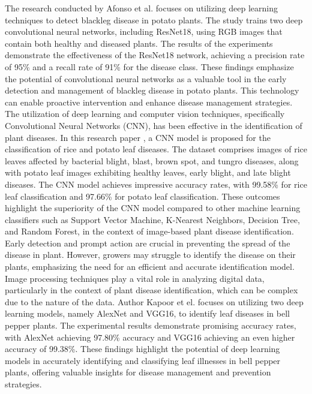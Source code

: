 \documentclass[conference]{IEEEtran}
\begin{document}
The research conducted by Afonso et al. \cite{AFONSO20196} focuses on utilizing deep learning techniques to detect blackleg disease in potato plants. The study trains two deep convolutional neural networks, including ResNet18, using RGB images that contain both healthy and diseased plants. The results of the experiments demonstrate the effectiveness of the ResNet18 network, achieving a precision rate of 95\% and a recall rate of 91\% for the disease class. These findings emphasize the potential of convolutional neural networks as a valuable tool in the early detection and management of blackleg disease in potato plants. This technology can enable proactive intervention and enhance disease management strategies.\\

 The utilization of deep learning and computer vision techniques, specifically Convolutional Neural Networks (CNN), has been effective in the identification of plant diseases. In this research paper \cite{sharma2022plant}, a CNN model is proposed for the classification of rice and potato leaf diseases. The dataset comprises images of rice leaves affected by bacterial blight, blast, brown spot, and tungro diseases, along with potato leaf images exhibiting healthy leaves, early blight, and late blight diseases. The CNN model achieves impressive accuracy rates, with 99.58\% for rice leaf classification and 97.66\% for potato leaf classification. These outcomes highlight the superiority of the CNN model compared to other machine learning classifiers such as Support Vector Machine, K-Nearest Neighbors, Decision Tree, and Random Forest, in the context of image-based plant disease identification.\\

Early detection and prompt action are crucial in preventing the spread of the disease in plant. However, growers may struggle to identify the disease on their plants, emphasizing the need for an efficient and accurate identification model. Image processing techniques play a vital role in analyzing digital data, particularly in the context of plant disease identification, which can be complex due to the nature of the data. Author Kapoor et el. \cite{kapoor2023bell} focuses on utilizing two deep learning models, namely AlexNet and VGG16, to identify leaf diseases in bell pepper plants. The experimental results demonstrate promising accuracy rates, with AlexNet achieving 97.80\% accuracy and VGG16 achieving an even higher accuracy of 99.38\%. These findings highlight the potential of deep learning models in accurately identifying and classifying leaf illnesses in bell pepper plants, offering valuable insights for disease management and prevention strategies.
\end{document}
